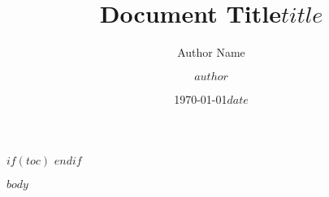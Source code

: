 \documentclass[12pt]{article} %
\title{Document Title}
\author{Author Name}
\date{\today}
\title{$title$}
\author{$author$}
\date{$date$}
\begin{document}
\maketitle

$if(toc)$
  \tableofcontents
  \newpage
$endif$

$body$
\end{document}
